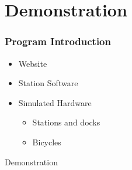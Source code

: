 \section{Demonstration}
\begin{frame}
\frametitle{Program Introduction}
\begin{itemize}
\item Website
\item Station Software
\item Simulated Hardware
\begin{itemize}
\item Stations and docks
\item Bicycles
\end{itemize}
\end{itemize}
\end{frame}

\begin{frame}
	\begin{center}
		\Huge Demonstration
	\end{center}
\end{frame}